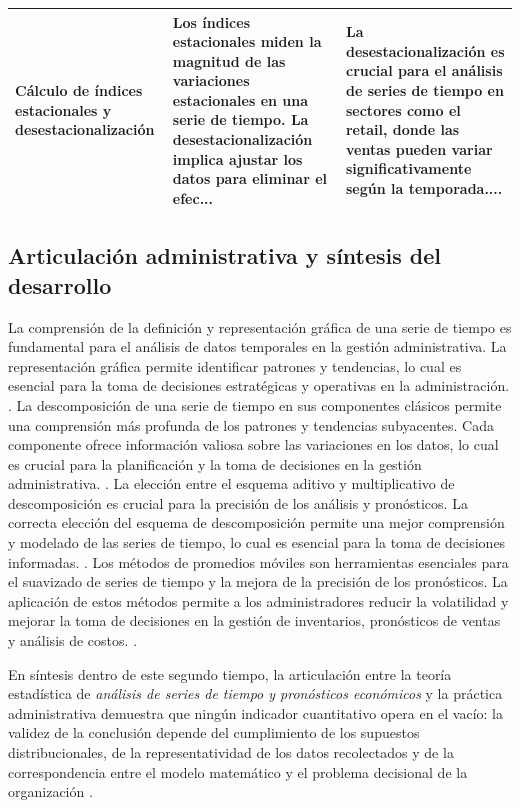 {\begin{center}
\begin{tabular}{p{3.6cm}p{5.2cm}p{5.8cm}}
Cálculo de índices estacionales y desestacionalización & Los índices estacionales miden la magnitud de las variaciones estacionales en una serie de tiempo. La desestacionalización implica ajustar los datos para eliminar el efec... & La desestacionalización es crucial para el análisis de series de tiempo en sectores como el retail, donde las ventas pueden variar significativamente según la temporada....\\\hline
\end{tabular}
\end{center}


\subsection{Articulación administrativa y síntesis del desarrollo}
La comprensión de la definición y representación gráfica de una serie de tiempo es fundamental para el análisis de datos temporales en la gestión administrativa. La representación gráfica permite identificar patrones y tendencias, lo cual es esencial para la toma de decisiones estratégicas y operativas en la administración. \citep{holmesBusiness2023,nistHandbook}.
La descomposición de una serie de tiempo en sus componentes clásicos permite una comprensión más profunda de los patrones y tendencias subyacentes. Cada componente ofrece información valiosa sobre las variaciones en los datos, lo cual es crucial para la planificación y la toma de decisiones en la gestión administrativa. \citep{holmesBusiness2023,nistHandbook}.
La elección entre el esquema aditivo y multiplicativo de descomposición es crucial para la precisión de los análisis y pronósticos. La correcta elección del esquema de descomposición permite una mejor comprensión y modelado de las series de tiempo, lo cual es esencial para la toma de decisiones informadas. \citep{holmesBusiness2023,nistHandbook}.
Los métodos de promedios móviles son herramientas esenciales para el suavizado de series de tiempo y la mejora de la precisión de los pronósticos. La aplicación de estos métodos permite a los administradores reducir la volatilidad y mejorar la toma de decisiones en la gestión de inventarios, pronósticos de ventas y análisis de costos. \citep{holmesBusiness2023,nistHandbook}.

En síntesis dentro de este segundo tiempo, la articulación entre la teoría estadística de \textit{análisis de series de tiempo y pronósticos económicos} y la práctica administrativa demuestra que ningún indicador cuantitativo opera en el vacío: la validez de la conclusión depende del cumplimiento de los supuestos distribucionales, de la representatividad de los datos recolectados y de la correspondencia entre el modelo matemático y el problema decisional de la organización \citep{anderson2012,nistHandbook,guarin2002}.

}
